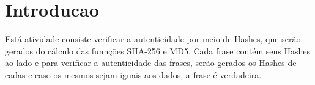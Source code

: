 \chapter{Introducao} \label{intro}

Está atividade consiste verificar a autenticidade por meio de Hashes, que serão 
gerados do cálculo das funnções SHA-256 e MD5. Cada frase contém seus Hashes ao lado
e para verificar a autenticidade das frases, serão gerados os Hashes de cadas e 
caso os mesmos sejam iguais aos dados, a frase é verdadeira.